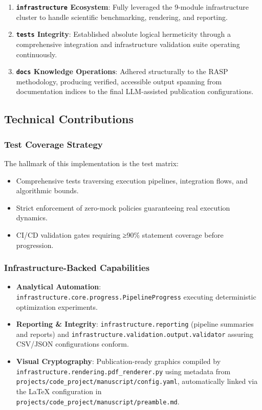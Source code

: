 \documentclass[
]{article}
\providecommand{\tightlist}{%
  \setlength{\itemsep}{0pt}\setlength{\parskip}{0pt}}
\begin{document}
\begin{enumerate}
\def\labelenumi{\arabic{enumi}.}
\tightlist
\item
  \textbf{\texttt{infrastructure} Ecosystem}: Fully leveraged the
  9-module infrastructure cluster to handle scientific benchmarking,
  rendering, and reporting.
\item
  \textbf{\texttt{tests} Integrity}: Established absolute logical
  hermeticity through a comprehensive integration and infrastructure
  validation suite operating continuously.
\item
  \textbf{\texttt{docs} Knowledge Operations}: Adhered structurally to
  the RASP methodology, producing verified, accessible output spanning
  from documentation indices to the final LLM-assisted publication
  configurations.
\end{enumerate}

\subsection{Technical Contributions}\label{technical-contributions}

\subsubsection{Test Coverage Strategy}\label{test-coverage-strategy}

The hallmark of this implementation is the test matrix:

\begin{itemize}
\tightlist
\item
  Comprehensive tests traversing execution pipelines, integration flows,
  and algorithmic bounds.
\item
  Strict enforcement of zero-mock policies guaranteeing real execution
  dynamics.
\item
  CI/CD validation gates requiring ≥90\% statement coverage before
  progression.
\end{itemize}

\subsubsection{Infrastructure-Backed
Capabilities}\label{infrastructure-backed-capabilities}

\begin{itemize}
\tightlist
\item
  \textbf{Analytical Automation}:
  \texttt{infrastructure.core.progress.PipelineProgress} executing
  deterministic optimization experiments.
\item
  \textbf{Reporting \& Integrity}: \texttt{infrastructure.reporting}
  (pipeline summaries and reports) and
  \texttt{infrastructure.validation.output.validator} assuring CSV/JSON
  configurations conform.
\item
  \textbf{Visual Cryptography}: Publication-ready graphics compiled by
  \texttt{infrastructure.rendering.pdf\_renderer.py} using metadata from
  \texttt{projects/code\_project/manuscript/config.yaml}, automatically
  linked via the LaTeX configuration in
  \texttt{projects/code\_project/manuscript/preamble.md}.
\end{itemize}
\end{document}
